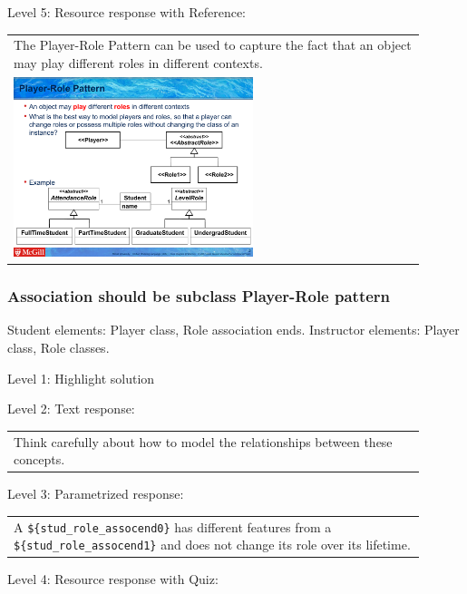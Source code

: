 \noindent Level 5: Resource response with Reference: \medskip

\begin{tabular}{|p{0.9\linewidth}}
The Player-Role Pattern can be used to capture the fact that an object may play different roles
in different contexts.

\\
\includegraphics[width=0.6\textwidth]{images/player_role.png}
\end{tabular} \medskip


\subsubsection{Association should be subclass Player-Role pattern}

Student elements: Player class, Role association ends. Instructor elements: Player class, Role classes. \medskip

\noindent Level 1: Highlight solution  \medskip

\noindent Level 2: Text response: \medskip

\begin{tabular}{|p{0.9\linewidth}}
Think carefully about how to model the relationships between these concepts.
\end{tabular} \medskip

\noindent Level 3: Parametrized response: \medskip

\begin{tabular}{|p{0.9\linewidth}}
A \verb|${stud_role_assocend0}| has different features from a \verb|${stud_role_assocend1}| and does not change its role over its lifetime.
\end{tabular} \medskip

\noindent Level 4: Resource response with Quiz: \medskip


